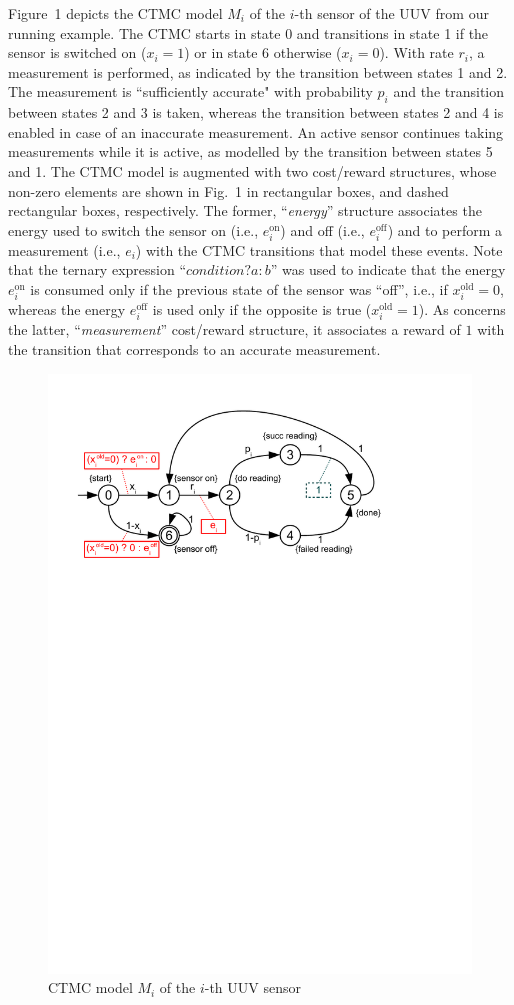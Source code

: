 \begin{example}
Figure~1 depicts the CTMC model $M_i$ of the $i$-th sensor of the UUV from our running example. The CTMC starts in state 0 and transitions in state 1 if the sensor is switched on ($x_i=1$) or in state 6 otherwise ($x_i=0$). With rate $r_i$,  a measurement is performed, as indicated by the transition between states 1 and 2. The measurement is ``sufficiently accurate" with probability $p_i$ and the transition between states 2 and 3 is taken, whereas the transition between states 2 and 4 is enabled in case of an inaccurate measurement. An active sensor continues taking measurements while it is active,  as modelled by the transition between states 5 and 1. The CTMC model is augmented with two cost/reward structures, whose non-zero elements are shown in Fig.~1 in rectangular boxes, and dashed rectangular boxes, respectively. The former, ``\textit{energy}'' structure associates the energy used to switch the sensor on (i.e., $e_i^\mathrm{on}$) and off (i.e., $e_i^\mathrm{off}$) and to perform a measurement (i.e., $e_i$) with the CTMC transitions that model these events. Note that the ternary expression ``$\mathit{condition}?a\!:\!b$'' was used to indicate that the energy $e_i^\mathrm{on}$ is consumed only if the previous state of the sensor was ``off'', i.e., if $x_i^\mathrm{old}=0$, whereas the energy $e_i^\mathrm{off}$ is used  only if the opposite is true ($x_i^\mathrm{old}=1$). As concerns the latter, ``\textit{measurement}'' cost/reward structure, it associates a reward of $1$ with the transition that corresponds to an accurate measurement. 

\begin{figure}[t]
\centering
\includegraphics[trim = 17mm 205mm 45mm 17mm, clip, width=0.7\linewidth]{figures/model.pdf}
\caption{CTMC model $M_i$ of the $i$-th UUV sensor}

\vspace*{-2mm}
\end{figure}

\end{example}

